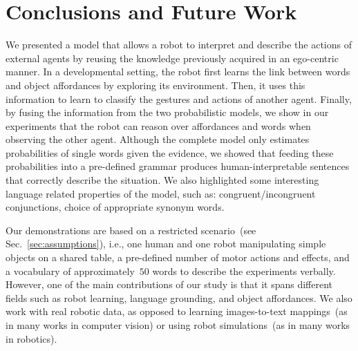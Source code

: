 
\section{Conclusions and Future Work}
\label{sec:conclusions}

We presented a model that allows a robot to interpret and describe the actions of external agents by reusing the knowledge previously acquired in an ego-centric manner.
In a developmental setting, the robot first learns the link between words and object affordances by exploring its environment.
Then, it uses this information to learn to classify the gestures and actions of another agent.
Finally, by fusing the information from the two probabilistic models, we show in our experiments that the robot can reason over affordances and words when observing the other agent.
Although the complete model only estimates probabilities of single words given the evidence, we showed that feeding these probabilities into a pre-defined grammar produces human-interpretable sentences that correctly describe the situation.
We also highlighted some interesting language related properties of the model, such as:
congruent/incongruent conjunctions,
choice of appropriate synonym words.

Our demonstrations are based on a restricted scenario~(see Sec.~\ref{sec:assumptions}), i.e., one human and one robot manipulating simple objects on a shared table, a pre-defined number of motor actions and effects, and a vocabulary of approximately~$50$ words to describe the experiments verbally.
However, one of the main contributions of our study is that it spans different fields such as robot learning, language grounding, and object affordances.
We also work with real robotic data, as opposed to learning images-to-text mappings~(as in many works in computer vision) or using robot simulations~(as in many works in robotics).


